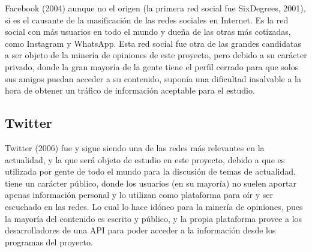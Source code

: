 	Facebook (2004) aunque no el origen (la primera red social fue SixDegrees, 2001), si es el causante de la masificación de las redes sociales en Internet. Es la red social con más usuarios en todo el mundo y dueña de las otras más cotizadas, como Instagram y WhatsApp. Esta red social fue otra de las grandes candidatas a ser objeto de la minería de opiniones de este proyecto, pero debido a su carácter privado, donde la gran mayoría de la gente tiene el perfil cerrado para que solos sus amigos puedan acceder a su contenido, suponía una dificultad insalvable a la hora de obtener un tráfico de información aceptable para el estudio. 
	
	\subsection{Twitter}
	
	Twitter (2006) fue y sigue siendo una de las redes más relevantes en la actualidad, y la que será objeto de estudio en este proyecto, debido a que es utilizada por gente de todo el mundo para la discusión de temas de actualidad, tiene un carácter público, donde los usuarios (en su mayoría) no suelen aportar apenas información personal y lo utilizan como plataforma para oír y ser escuchado en las redes. Lo cual lo hace idóneo para la minería de opiniones, pues la mayoría del contenido es escrito y público, y la propia plataforma provee a los desarrolladores de una API para poder acceder a la información desde los programas del proyecto.

	
